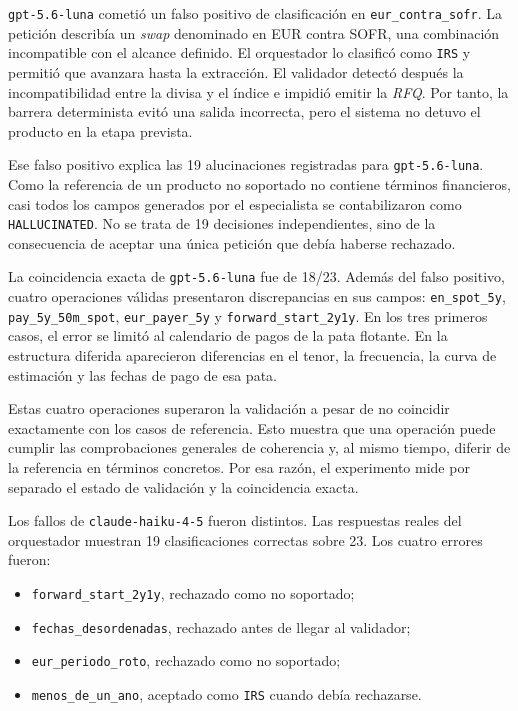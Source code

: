 \texttt{gpt-5.6-luna} cometió un falso positivo de clasificación en \texttt{eur\_contra\_sofr}. La petición describía un \textit{swap} denominado en EUR contra SOFR, una combinación incompatible con el alcance definido. El orquestador lo clasificó como \texttt{IRS} y permitió que avanzara hasta la extracción. El validador detectó después la incompatibilidad entre la divisa y el índice e impidió emitir la \textit{RFQ}. Por tanto, la barrera determinista evitó una salida incorrecta, pero el sistema no detuvo el producto en la etapa prevista.

Ese falso positivo explica las 19 alucinaciones registradas para \texttt{gpt-5.6-luna}. Como la referencia de un producto no soportado no contiene términos financieros, casi todos los campos generados por el especialista se contabilizaron como \texttt{HALLUCINATED}. No se trata de 19 decisiones independientes, sino de la consecuencia de aceptar una única petición que debía haberse rechazado.

La coincidencia exacta de \texttt{gpt-5.6-luna} fue de 18/23. Además del falso positivo, cuatro operaciones válidas presentaron discrepancias en sus campos: \texttt{en\_spot\_5y}, \texttt{pay\_5y\_50m\_spot}, \texttt{eur\_payer\_5y} y \texttt{forward\_start\_2y1y}. En los tres primeros casos, el error se limitó al calendario de pagos de la pata flotante. En la estructura diferida aparecieron diferencias en el tenor, la frecuencia, la curva de estimación y las fechas de pago de esa pata.

Estas cuatro operaciones superaron la validación a pesar de no coincidir exactamente con los casos de referencia. Esto muestra que una operación puede cumplir las comprobaciones generales de coherencia y, al mismo tiempo, diferir de la referencia en términos concretos. Por esa razón, el experimento mide por separado el estado de validación y la coincidencia exacta.

Los fallos de \texttt{claude-haiku-4-5} fueron distintos. Las respuestas reales del orquestador muestran 19 clasificaciones correctas sobre 23. Los cuatro errores fueron:

\begin{itemize}
    \item \texttt{forward\_start\_2y1y}, rechazado como no soportado;
    \item \texttt{fechas\_desordenadas}, rechazado antes de llegar al validador;
    \item \texttt{eur\_periodo\_roto}, rechazado como no soportado;
    \item \texttt{menos\_de\_un\_ano}, aceptado como \texttt{IRS} cuando debía rechazarse.
\end{itemize}

